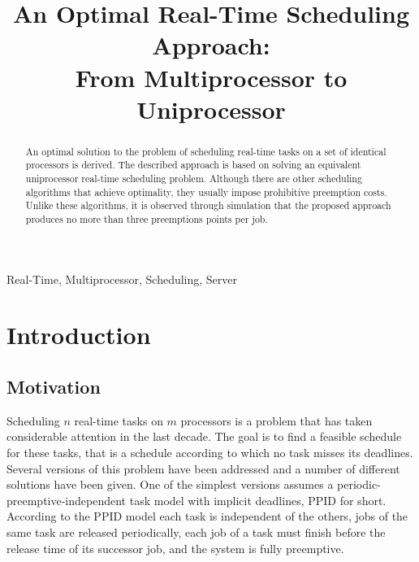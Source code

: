 \documentclass[twocolumn, compsocconf]{IEEEtran}
\newcounter{proc}
\begin{document}
\title{
An Optimal Real-Time Scheduling Approach:\\From Multiprocessor to Uniprocessor
}





\author{
}


\maketitle

\begin{abstract}
  An optimal solution to the problem of scheduling real-time tasks on a set of
  identical processors is derived. The described approach is based on solving an
  equivalent uniprocessor real-time scheduling problem. Although there are other
  scheduling algorithms that achieve optimality, they usually impose prohibitive
  preemption costs. Unlike these algorithms, it is observed through simulation
  that the proposed approach produces no more than three preemptions points per
  job.
\end{abstract}

\begin{IEEEkeywords}
  Real-Time, Multiprocessor, Scheduling, Server
\end{IEEEkeywords}


\IEEEpeerreviewmaketitle

\section{Introduction}\label{sec:introduction}

\subsection{Motivation}\label{sec:motiv}

Scheduling $n$ real-time tasks on $m$ processors is a problem that has taken
considerable attention in the last decade. The goal is to find a feasible
schedule for these tasks, that is a schedule according to which no task misses
its deadlines. Several versions of this problem have been addressed and a number
of different solutions have been given. One of the simplest versions assumes a
periodic-preemptive-independent task model with implicit deadlines, PPID for
short. According to the PPID model each task is independent of the others, jobs
of the same task are released periodically, each job of a task must finish
before the release time of its successor job, and the system is fully
preemptive.
 
\end{document}
